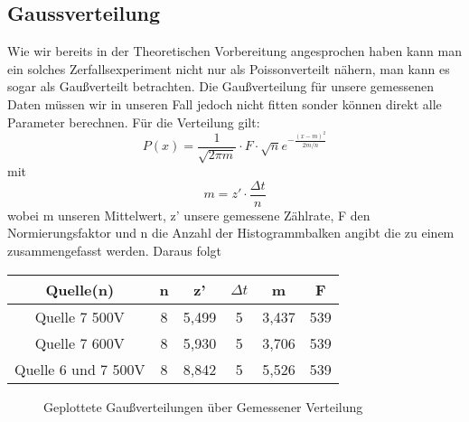 \documentclass{article}
\begin{document}
        \subsection{Gaussverteilung}
            Wie wir bereits in der Theoretischen Vorbereitung angesprochen haben kann man ein solches Zerfallsexperiment
            nicht nur als Poissonverteilt nähern, man kann es sogar als Gaußverteilt betrachten. Die Gaußverteilung
            für unsere gemessenen Daten müssen wir in unseren Fall jedoch nicht fitten sonder können direkt alle Parameter
            berechnen. Für die Verteilung gilt:
            $$ P(x) = \frac{1}{\sqrt{2\pi m}} \cdot F \cdot \sqrt{n} e^{-\frac{(x-m)^2}{2m/n}}$$
            mit
            $$ m = z'\cdot\frac{\Delta t}{n} $$
            wobei m unseren Mittelwert, z' unsere gemessene Zählrate, F den Normierungsfaktor und n die Anzahl der Histogrammbalken
            angibt die zu einem zusammengefasst werden.
            Daraus folgt
            \begin{center}
                \begin{tabular}{|c|c|c|c|c|c|}
                    \hline
                    Quelle(n) & n & z' & $\Delta t$ & m & F \\
                    \hline
                    Quelle 7 500V & 8 & 5,499 & 5 & 3,437 & 539 \\
                    Quelle 7 600V & 8 & 5,930 & 5 & 3,706 & 539 \\
                    Quelle 6 und 7 500V & 8 & 8,842 & 5 & 5,526 & 539 \\
                    \hline 

                \end{tabular}
            \end{center}

            \begin{figure}[H]  
                \centering 
                 \quad 
                 \quad
                 \caption{Geplottete Gaußverteilungen über Gemessener Verteilung} 
             \end{figure}
\end{document}
